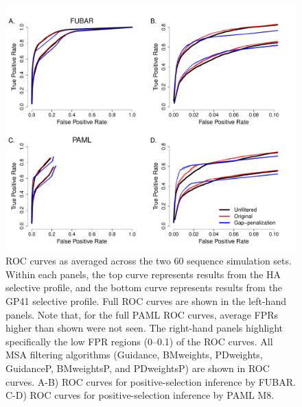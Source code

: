 \documentclass[11pt]{article}
\begin{document}
\begin{figure}[H]
\centerline{\includegraphics[width=6in]{Figures/ROC_prk.pdf}}
\caption{\label{roc} ROC curves as averaged across the two 60 sequence simulation sets. Within each panels, the top curve represents results from the HA selective profile, and the bottom curve represents results from the GP41 selective profile. Full ROC curves are shown in the left-hand panels. Note that, for the full PAML ROC curves, average FPRs higher than shown were not seen. The right-hand panels highlight specifically the low FPR regions (0--0.1) of the ROC curves. All MSA filtering algorithms (Guidance, BMweights, PDweights, GuidanceP, BMweightsP, and PDweightsP) are shown in ROC curves. A-B) ROC curves for positive-selection inference by FUBAR. C-D) ROC curves for positive-selection inference by PAML M8.}
\end{figure}
\end{document}
